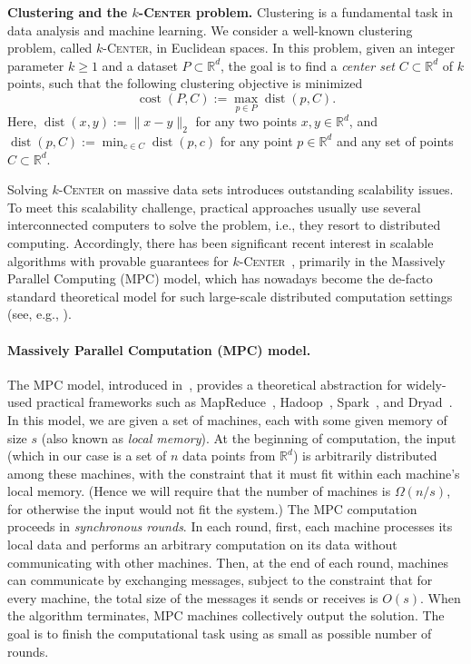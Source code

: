 \documentclass[11pt,letterpaper]{article}
\theoremstyle{plain}
\theoremstyle{definition}
\theoremstyle{remark}
\newcommand{\ProblemName}[1]{\textsc{#1}}
\newcommand{\kCenter}{$k$-\ProblemName{Center}\xspace}
\DeclareMathOperator{\cost}{cost}
\DeclareMathOperator{\dist}{dist}
\begin{document}
\noindent\textbf{Clustering and the \kCenter problem.} Clustering is a fundamental task in data analysis and machine learning.
We consider a well-known clustering problem, called \kCenter, in Euclidean spaces.
In this problem, given an integer parameter $k \geq 1$ and a dataset $P \subset \mathbb{R}^d$,
the goal is to find a \emph{center set} $C \subset \mathbb{R}^d$ of $k$ points,
such that the following clustering objective is minimized
\begin{equation}
    \label{eqn:kcenter_def}
    \cost(P, C) := \max_{p \in P} \dist(p, C).
\end{equation}
Here, $\dist(x, y) := \|x - y\|_2$ for any two points $x, y \in \mathbb{R}^d$, and $\dist(p, C) := \min_{c \in C} \dist(p, c)$ for any point $p\in \mathbb{R}^d$ and any set of points $C \subset \mathbb{R}^d$.

Solving \kCenter on massive data sets introduces outstanding scalability issues.
To meet this scalability challenge, practical approaches usually use several interconnected computers to solve the problem, i.e., they resort to distributed computing. Accordingly, there has been significant recent interest in scalable algorithms with provable guarantees for \kCenter~\cite{EneIM11,ImM15,MalkomesKCWM15,CeccarelloPP19,BEFM21,CCM23,HZ23,AG23,BBM23,BP24,LFWXW24}, primarily in the Massively Parallel Computing (MPC) model, which has nowadays become the de-facto standard theoretical model for such large-scale distributed computation settings (see, e.g., \cite{GSZ11,BKS17,IKLMV23}).

\paragraph{Massively Parallel Computation (MPC) model.}
The MPC model, introduced in~\cite{KarloffSV10}, provides a theoretical abstraction for widely-used practical frameworks such as MapReduce~\cite{DBLP:journals/cacm/DeanG08},
Hadoop~\cite{white2012hadoop}, Spark~\cite{DBLP:conf/hotcloud/ZahariaCFSS10}, and Dryad~\cite{DBLP:conf/eurosys/IsardBYBF07}.
In this model, we are given a set of machines, each with some given memory of size $s$ (also known as \emph{local memory}). At the beginning of computation, the input (which in our case is a set of $n$ data points from $\mathbb{R}^d$) is arbitrarily distributed among these machines, with the constraint that it must fit within each machine's local memory. (Hence we will require that the number of machines is $\Omega(n/s)$, for otherwise the input would not fit the system.) The MPC computation proceeds in \emph{synchronous rounds}.
In each round, first, each machine processes its local data and performs an arbitrary computation on its data without communicating with other machines. Then, at the end of each round, machines can communicate by exchanging messages, subject to the constraint that for every machine, the total size of the messages it sends or receives is $O(s)$.
When the algorithm terminates, MPC machines collectively output the solution.
The goal is to finish the computational task using as small as possible number of rounds.
\end{document}
